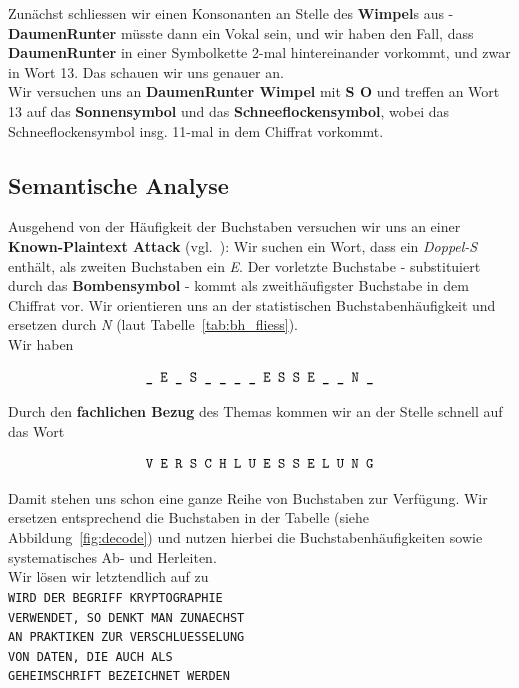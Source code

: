 \noindent
Zunächst schliessen wir einen Konsonanten an Stelle des \textbf{Wimpel}s aus - \textbf{DaumenRunter} müsste dann ein Vokal sein, und wir haben den Fall, dass \textbf{DaumenRunter} in einer Symbolkette 2-mal hintereinander vorkommt, und zwar in Wort 13.
Das schauen wir uns genauer an.\\
Wir versuchen uns an \textbf{DaumenRunter Wimpel} mit \textbf{S O} und treffen an Wort 13 auf das \textbf{Sonnensymbol} und das \textbf{Schneeflockensymbol}, wobei das Schneeflockensymbol insg. 11-mal in dem Chiffrat vorkommt.

\subsection*{Semantische Analyse}
Ausgehend von der Häufigkeit der Buchstaben versuchen wir uns an einer \textbf{Known-Plaintext Attack} (vgl.~\cite[50]{ITS3}): Wir suchen ein Wort, dass ein \textit{Doppel-S} enthält, als zweiten Buchstaben ein \textit{E}.
Der vorletzte Buchstabe - substituiert durch das \textbf{Bombensymbol} - kommt als zweithäufigster Buchstabe in dem Chiffrat vor.
Wir orientieren uns an der statistischen Buchstabenhäufigkeit und ersetzen durch \textit{N} (laut Tabelle~\ref{tab:bh_fliess}).\\

\noindent
Wir haben

\begin{equation}\notag
    \texttt{\_ E \_ S \_ \_ \_ \_ E S S E \_ \_ N \_}
\end{equation}

\noindent
Durch den \textbf{fachlichen Bezug} des Themas kommen wir an der Stelle schnell auf das Wort

\begin{equation}\notag
\texttt{V E R S C H L U E S S E L U N G}
\end{equation}

\noindent
Damit stehen uns schon eine ganze Reihe von Buchstaben zur Verfügung.
Wir ersetzen entsprechend die Buchstaben in der Tabelle (siehe Abbildung~\ref{fig:decode}) und nutzen hierbei die Buchstabenhäufigkeiten sowie systematisches Ab- und Herleiten.\\
Wir lösen wir letztendlich auf zu\\

\noindent
\texttt{WIRD DER BEGRIFF KRYPTOGRAPHIE}\\
\texttt{VERWENDET, SO DENKT MAN ZUNAECHST}\\
\texttt{AN PRAKTIKEN ZUR VERSCHLUESSELUNG}\\
\texttt{VON DATEN, DIE AUCH ALS}\\
\texttt{GEHEIMSCHRIFT BEZEICHNET WERDEN}\\


